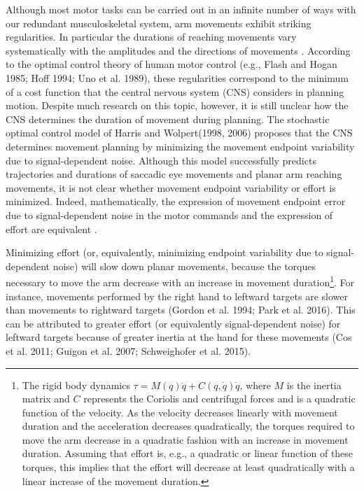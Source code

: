Although most motor tasks can be carried out in an infinite number of ways with our redundant musculoskeletal system, arm movements exhibit striking regularities. In particular the durations of reaching movements vary systematically with the amplitudes and the directions of movements \cite{Gordon1994}. According to the optimal control theory of human motor control (e.g., \cite{Flash1985, Hoff1994, Uno1989} Flash and Hogan 1985; Hoff 1994; Uno et al. 1989), these regularities correspond to the minimum of a cost function that the central nervous system (CNS) considers in planning motion. Despite much research on this topic, however, it is still unclear how the CNS determines the duration of movement during planning. The stochastic optimal control model of \cite{Harris1998, Harris2006} Harris and Wolpert(1998, 2006) proposes that the CNS determines movement planning by minimizing the movement endpoint variability due to signal-dependent noise. Although this model successfully predicts trajectories and durations of saccadic eye movements and planar arm reaching movements, it is not clear whether movement endpoint variability or effort is minimized. Indeed, mathematically, the expression of movement endpoint error due to signal-dependent noise in the motor commands and the expression of effort are equivalent \cite{OSullivan2009}.

Minimizing effort (or, equivalently, minimizing endpoint variability due to signal-dependent noise) will slow down planar movements, because the torques necessary to move the arm decrease with an increase in movement duration\footnote{The rigid body dynamics $\tau = M(q)\ddot{q} + C(q,\dot{q})\dot{q}$, where $M$ is the inertia matrix and $C$ represents the Coriolis and centrifugal forces and is a quadratic function of the velocity. As the velocity decreases linearly with movement duration and the acceleration decreases quadratically, the torques required to move the arm decrease in a quadratic fashion with an increase in movement duration. Assuming that effort is, e.g., a quadratic or linear function of these torques, this implies that the effort will decrease at least quadratically with a linear increase of the movement duration.}. 
For instance, movements performed by the right hand to leftward targets are slower than movements to rightward targets \cite{Gordon1994,Park2016} (Gordon et al. 1994; Park et al. 2016). This can be attributed to greater effort (or equivalently signal-dependent noise) for leftward targets because of greater inertia at the hand for these movements \cite{Cos2011, Guigon2007, Schweighofer2015} (Cos et al. 2011; Guigon et al. 2007; Schweighofer et al. 2015). 

